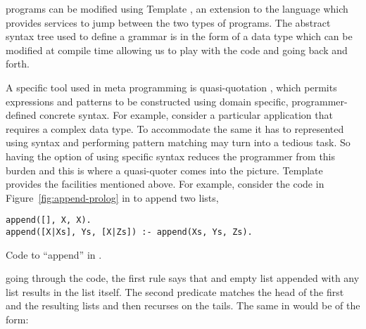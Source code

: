 \documentclass[thesis-solanki.tex]{subfiles}
\begin{document}
 programs can be modified using Template  \cite{website:templatehaskell}, an
extension to the language which provides services to jump between the two types of programs.
The abstract syntax tree used to define a grammar is in the form of a  data type which can be
modified at compile time allowing us to play with the code and going back and forth.

A specific tool used in meta programming is quasi-quotation \cite{mainland2007s,haskellquasi,wikiquasi}, which
permits  expressions and patterns to be constructed using domain specific,
pro\-gram\-mer-de\-fined concrete syntax.
For example, consider a particular application that requires a complex data type.
To accommodate the same it has to represented
using  syntax and performing pattern matching may turn into a tedious task.
So having the option of using specific syntax reduces the programmer from this burden and this is where a
quasi-quoter comes into the picture.
Template  provides the facilities mentioned above.
For example, consider the code in Figure~\ref{fig:append-prolog}
in  to append two lists,
\begin{code-list}[h]
\begin{verbatim}
append([], X, X).
append([X|Xs], Ys, [X|Zs]) :- append(Xs, Ys, Zs).
\end{verbatim}    
\vspace*{-0.8\baselineskip}
\caption{Code to ``append'' in \protect{}.}
\label{fig:append-prolog}
\end{code-list}
going through the code, the first rule says that and empty list appended with any list results in the list itself.
The second predicate matches the head of the first and the resulting lists and then recurses on the tails.
The same in  would be of the form:
\end{document}
